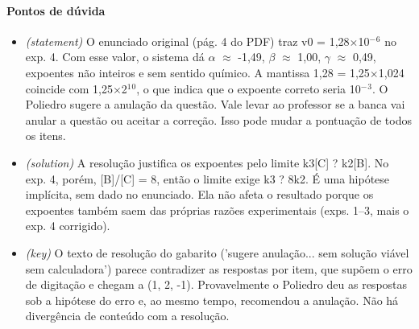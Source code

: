 \documentclass{article}%
\begin{document}
\paragraph{Pontos de dúvida}%
\begin{itemize}%
\item%
\textit{(statement)} O enunciado original (pág. 4 do PDF) traz v0 = 1,28$\times$10$^{-}$$^{6}$ no exp. 4. Com esse valor, o sistema dá $\alpha$ $\approx$ -1,49, $\beta$ $\approx$ 1,00, $\gamma$ $\approx$ 0,49, expoentes não inteiros e sem sentido químico. A mantissa 1,28 = 1,25$\times$1,024 coincide com 1,25$\times$2$^{1}$$^{0}$, o que indica que o expoente correto seria 10$^{-}$$^3$. O Poliedro sugere a anulação da questão. Vale levar ao professor se a banca vai anular a questão ou aceitar a correção. Isso pode mudar a pontuação de todos os itens.%
\item%
\textit{(solution)} A resolução justifica os expoentes pelo limite k3{[}C{]} ? k2{[}B{]}. No exp. 4, porém, {[}B{]}/{[}C{]} = 8, então o limite exige k3 ? 8k2. É uma hipótese implícita, sem dado no enunciado. Ela não afeta o resultado porque os expoentes também saem das próprias razões experimentais (exps. 1--3, mais o exp. 4 corrigido).%
\item%
\textit{(key)} O texto de resolução do gabarito ('sugere anulação... sem solução viável sem calculadora') parece contradizer as respostas por item, que supõem o erro de digitação e chegam a (1, 2, -1). Provavelmente o Poliedro deu as respostas sob a hipótese do erro e, ao mesmo tempo, recomendou a anulação. Não há divergência de conteúdo com a resolução.%
\end{itemize}%
\end{document}
